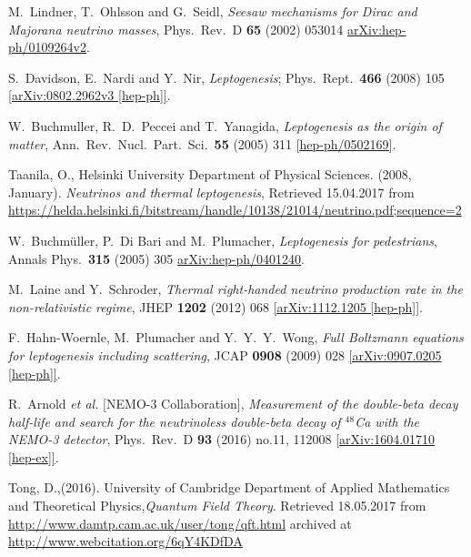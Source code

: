 \begin{thebibliography}{56}
M.~Lindner, T.~Ohlsson and G.~Seidl,
\textit{Seesaw mechanisms for Dirac and Majorana neutrino masses},
Phys.\ Rev.\ D {\textbf{ 65}} (2002) 053014
\href{https://arxiv.org/abs/hep-ph/0109264v2}{arXiv:hep-ph/0109264v2}.

S.~Davidson, E.~Nardi and Y.~Nir,
\textit{Leptogenesis};
Phys.\ Rept.\  {\textbf{466}} (2008) 105
\href{https://arxiv.org/abs/0802.2962v3}{[arXiv:0802.2962v3 [hep-ph]]}.

W.~Buchmuller, R.~D.~Peccei and T.~Yanagida,
\textit{Leptogenesis as the origin of matter},
Ann.\ Rev.\ Nucl.\ Part.\ Sci.\  {\textbf{55}} (2005) 311
\href{https://arxiv.org/abs/hep-ph/0502169}{[hep-ph/0502169]}.

Taanila, O., Helsinki University Department of Physical Sciences. (2008, January). \textit{Neutrinos and thermal leptogenesis}, Retrieved 15.04.2017 from \href{https://helda.helsinki.fi/bitstream/handle/10138/21014/neutrino.pdf;sequence=2}{https://helda.helsinki.fi/bitstream/handle/10138/21014/neutrino.pdf;sequence=2}

W.~Buchm\"uller, P.~Di Bari and M.~Plumacher,
\textit{Leptogenesis for pedestrians},
Annals Phys.\  {\textbf{315}} (2005) 305
\href{https://arxiv.org/abs/hep-ph/0401240v1}{arXiv:hep-ph/0401240}.

M.~Laine and Y.~Schroder,
\textit{Thermal right-handed neutrino production rate in the non-relativistic regime},
JHEP {\textbf{1202}} (2012) 068
\href{https://arxiv.org/abs/1112.1205v2}{[arXiv:1112.1205 [hep-ph]]}.

F.~Hahn-Woernle, M.~Plumacher and Y.~Y.~Y.~Wong,
\textit{Full Boltzmann equations for leptogenesis including scattering},
JCAP {\textbf{0908}} (2009) 028
\href{https://arxiv.org/abs/0907.0205v2}{[arXiv:0907.0205 [hep-ph]]}.

R.~Arnold {\textit{et al.}} [NEMO-3 Collaboration],
\textit{Measurement of the double-beta decay half-life and search for the neutrinoless double-beta decay of $^{48}$Ca with the NEMO-3 detector},
Phys.\ Rev.\ D {\textbf{93}} (2016) no.11,  112008
\href{https://arxiv.org/abs/1604.01710}{[arXiv:1604.01710 [hep-ex]]}.

Tong, D.,(2016). University of Cambridge Department of Applied Mathematics and Theoretical Physics,\textit{Quantum Field Theory}.  Retrieved
18.05.2017 from \href{http://www.damtp.cam.ac.uk/user/tong/qft.html}{http://www.damtp.cam.ac.uk/user/tong/qft.html} archived at
\href{http://www.webcitation.org/6qY4KDfDA}{http://www.webcitation.org/6qY4KDfDA}


\end{thebibliography}

